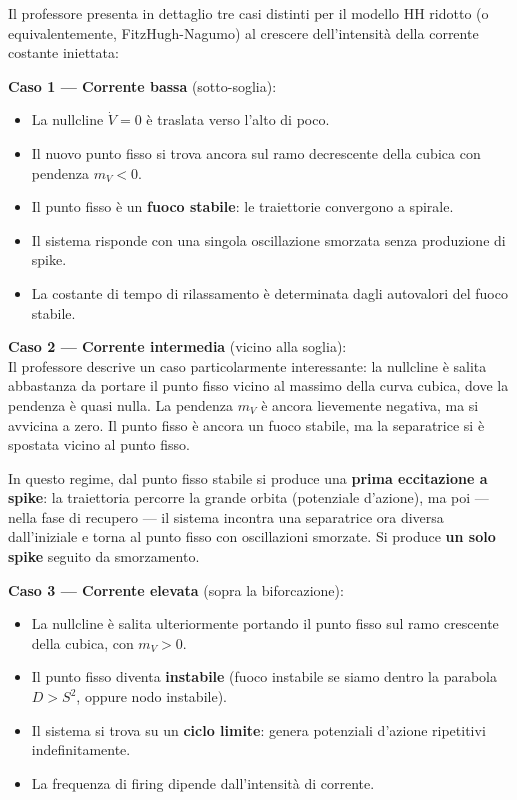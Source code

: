 Il professore presenta in dettaglio tre casi distinti per il modello HH ridotto (o equivalentemente, FitzHugh-Nagumo) al crescere dell'intensità della corrente costante iniettata:

\textbf{Caso 1 — Corrente bassa} (sotto-soglia):
\begin{itemize}
    \item La nullcline $\dot{V} = 0$ è traslata verso l'alto di poco.
    \item Il nuovo punto fisso si trova ancora sul ramo decrescente della cubica con pendenza $m_V < 0$.
    \item Il punto fisso è un \textbf{fuoco stabile}: le traiettorie convergono a spirale.
    \item Il sistema risponde con una singola oscillazione smorzata senza produzione di spike.
    \item La costante di tempo di rilassamento è determinata dagli autovalori del fuoco stabile.
\end{itemize}

\textbf{Caso 2 — Corrente intermedia} (vicino alla soglia):\\
Il professore descrive un caso particolarmente interessante: la nullcline è salita abbastanza da portare il punto fisso vicino al massimo della curva cubica, dove la pendenza è quasi nulla. La pendenza $m_V$ è ancora lievemente negativa, ma si avvicina a zero. Il punto fisso è ancora un fuoco stabile, ma la separatrice si è spostata vicino al punto fisso.

In questo regime, dal punto fisso stabile si produce una \textbf{prima eccitazione a spike}: la traiettoria percorre la grande orbita (potenziale d'azione), ma poi — nella fase di recupero — il sistema incontra una separatrice ora diversa dall'iniziale e torna al punto fisso con oscillazioni smorzate. Si produce \textbf{un solo spike} seguito da smorzamento.

\textbf{Caso 3 — Corrente elevata} (sopra la biforcazione):
\begin{itemize}
    \item La nullcline è salita ulteriormente portando il punto fisso sul ramo crescente della cubica, con $m_V > 0$.
    \item Il punto fisso diventa \textbf{instabile} (fuoco instabile se siamo dentro la parabola $D > S^2$, oppure nodo instabile).
    \item Il sistema si trova su un \textbf{ciclo limite}: genera potenziali d'azione ripetitivi indefinitamente.
    \item La frequenza di firing dipende dall'intensità di corrente.
\end{itemize}

